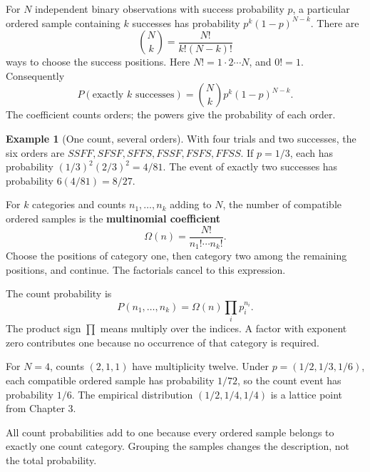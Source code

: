 \documentclass[11pt,oneside,openany]{book}
\theoremstyle{definition}
\newtheorem{example}{Example}[chapter]
\theoremstyle{remark}
\numberwithin{equation}{chapter}
\begin{document}
For \(N\) independent binary observations with success probability \(p\), a particular ordered sample containing \(k\) successes has probability \(p^k(1-p)^{N-k}\). There are \[\binom Nk=\frac{N!}{k!(N-k)!}\] ways to choose the success positions. Here \(N!=1\cdot2\cdots N\), and \(0!=1\). Consequently \[P(\text{exactly }k\text{ successes})=\binom Nk p^k(1-p)^{N-k}.\] The coefficient counts orders; the powers give the probability of each order.

\begin{example}[One count, several orders]

With four trials and two successes, the six orders are \(SSFF,SFSF,SFFS,FSSF,FSFS,FFSS\). If \(p=1/3\), each has probability \((1/3)^2(2/3)^2=4/81\). The event of exactly two successes has probability \(6(4/81)=8/27\).

\end{example}

For \(k\) categories and counts \(n_1,\ldots,n_k\) adding to \(N\), the number of compatible ordered samples is the \textbf{multinomial coefficient} \[\Omega(n)=\frac{N!}{n_1!\cdots n_k!}.\] Choose the positions of category one, then category two among the remaining positions, and continue. The factorials cancel to this expression.

The count probability is \[\boxed{P(n_1,\ldots,n_k)=\Omega(n)\prod_i p_i^{n_i}.}\] The product sign \(\prod\) means multiply over the indices. A factor with exponent zero contributes one because no occurrence of that category is required.

For \(N=4\), counts \((2,1,1)\) have multiplicity twelve. Under \(p=(1/2,1/3,1/6)\), each compatible ordered sample has probability \(1/72\), so the count event has probability \(1/6\). The empirical distribution \((1/2,1/4,1/4)\) is a lattice point from Chapter 3.

All count probabilities add to one because every ordered sample belongs to exactly one count category. Grouping the samples changes the description, not the total probability.
\end{document}
